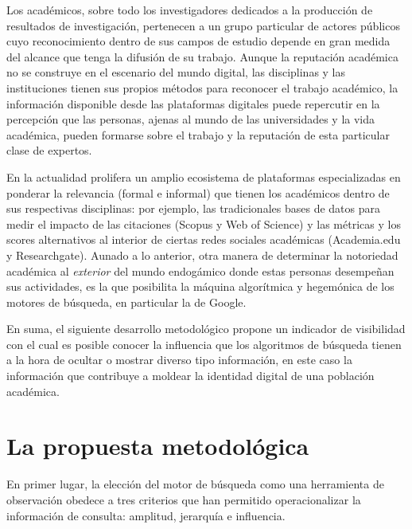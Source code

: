 \documentclass[
  spanish,
  11pt,
  a4paper,
]{scrbook}
\begin{document}
Los académicos, sobre todo los investigadores dedicados a la producción
de resultados de investigación, pertenecen a un grupo particular de
actores públicos cuyo reconocimiento dentro de sus campos de estudio
depende en gran medida del alcance que tenga la difusión de su trabajo.
Aunque la reputación académica no se construye en el escenario del mundo
digital, las disciplinas y las instituciones tienen sus propios métodos
para reconocer el trabajo académico, la información disponible desde las
plataformas digitales puede repercutir en la percepción que las
personas, ajenas al mundo de las universidades y la vida académica,
pueden formarse sobre el trabajo y la reputación de esta particular
clase de expertos.

En la actualidad prolifera un amplio ecosistema de plataformas
especializadas en ponderar la relevancia (formal e informal) que tienen
los académicos dentro de sus respectivas disciplinas: por ejemplo, las
tradicionales bases de datos para medir el impacto de las citaciones
(Scopus y Web of Science) y las métricas y los scores alternativos al
interior de ciertas redes sociales académicas (Academia.edu y
Researchgate). Aunado a lo anterior, otra manera de determinar la
notoriedad académica al \emph{exterior} del mundo endogámico donde estas
personas desempeñan sus actividades, es la que posibilita la máquina
algorítmica y hegemónica de los motores de búsqueda, en particular la de
Google.

En suma, el siguiente desarrollo metodológico propone un indicador de
visibilidad con el cual es posible conocer la influencia que los
algoritmos de búsqueda tienen a la hora de ocultar o mostrar diverso
tipo información, en este caso la información que contribuye a moldear
la identidad digital de una población académica.

\section*{La propuesta metodológica}\label{la-propuesta-metodoluxf3gica}


En primer lugar, la elección del motor de búsqueda como una herramienta
de observación obedece a tres criterios que han permitido
operacionalizar la información de consulta: amplitud, jerarquía e
influencia.
\end{document}
